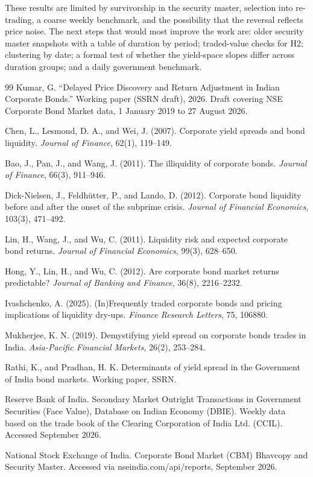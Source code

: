 \documentclass[a4paper,11pt]{article}
\begin{document}
These results are limited by survivorship in the security master, selection into re-trading, a coarse weekly benchmark, and the possibility that the reversal reflects price noise. The next steps that would most improve the work are: older security master snapshots with a table of duration by period; traded-value checks for H2; clustering by date; a formal test of whether the yield-space slopes differ across duration groups; and a daily government benchmark.

\clearpage
\begin{thebibliography}{99}
Kumar, G. ``Delayed Price Discovery and Return Adjustment in Indian Corporate Bonds.'' Working paper (SSRN draft), 2026. Draft covering NSE Corporate Bond Market data, 1 January 2019 to 27 August 2026.

Chen, L., Lesmond, D. A., and Wei, J. (2007). Corporate yield spreads and bond liquidity. \emph{Journal of Finance}, 62(1), 119--149.

Bao, J., Pan, J., and Wang, J. (2011). The illiquidity of corporate bonds. \emph{Journal of Finance}, 66(3), 911--946.

Dick-Nielsen, J., Feldh{\"u}tter, P., and Lando, D. (2012). Corporate bond liquidity before and after the onset of the subprime crisis. \emph{Journal of Financial Economics}, 103(3), 471--492.

Lin, H., Wang, J., and Wu, C. (2011). Liquidity risk and expected corporate bond returns. \emph{Journal of Financial Economics}, 99(3), 628--650.

Hong, Y., Lin, H., and Wu, C. (2012). Are corporate bond market returns predictable? \emph{Journal of Banking and Finance}, 36(8), 2216--2232.

Ivashchenko, A. (2025). (In)Frequently traded corporate bonds and pricing implications of liquidity dry-ups. \emph{Finance Research Letters}, 75, 106880.

Mukherjee, K. N. (2019). Demystifying yield spread on corporate bonds trades in India. \emph{Asia-Pacific Financial Markets}, 26(2), 253--284.

Rathi, K., and Pradhan, H. K. Determinants of yield spread in the Government of India bond markets. Working paper, SSRN.

Reserve Bank of India. Secondary Market Outright Transactions in Government Securities (Face Value), Database on Indian Economy (DBIE). Weekly data based on the trade book of the Clearing Corporation of India Ltd. (CCIL). Accessed September 2026.

National Stock Exchange of India. Corporate Bond Market (CBM) Bhavcopy and Security Master. Accessed via nseindia.com/api/reports, September 2026.
\end{thebibliography}
\end{document}
